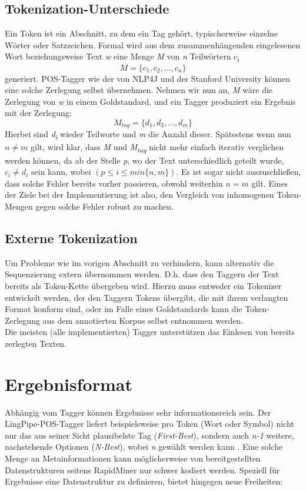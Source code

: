 \subsection{Tokenization-Unterschiede}
\label{sec:concept:sequence:tok}

Ein Token ist ein Abschnitt, zu dem ein Tag gehört, typischerweise einzelne Wörter oder Satzzeichen. Formal wird aus dem zusammenhängenden eingelesenen Wort beziehungsweise Text \textit{w} eine Menge \textit{M} von \textit{n} Teilwörtern c\textsubscript{i} 
 \[  M = \{ c_1 , c_2 , ... , c_n \} \] 
 generiert. POS-Tagger wie der von NLP4J \cite{choi} und der Stanford University \cite{Paper:StanfordTagger} können eine solche Zerlegung selbst übernehmen. Nehmen wir nun an, \textit{M} wäre die Zerlegung von \textit{w} in einem Goldstandard, und ein Tagger produziert ein Ergebnis mit der Zerlegung:
 \[  M_{tag} = \{ d_1 , d_2 , ... , d_m \} \]
Hierbei sind \textit{d\textsubscript{i}} wieder Teilworte und \textit{m} die Anzahl dieser. Spätestens wenn nun $n \neq m$ gilt, wird klar, dass \textit{M} und \textit{M\textsubscript{tag}} nicht mehr einfach iterativ verglichen werden können, da ab der Stelle \textit{p}, wo der Text unterschiedlich geteilt wurde, $ c_i \neq d_i $ sein kann, wobei $ (p \leq i \leq min\{ n, m \}) $. Es ist sogar nicht auszuschließen, dass solche Fehler bereits vorher passieren, obwohl weiterhin $n = m$ gilt.
\newline
Eines der Ziele bei der Implementierung ist also, den Vergleich von inhomogenen Token-Mengen gegen solche Fehler robust zu machen. 

\subsection{Externe Tokenization}
Um Probleme wie im vorigen Abschnitt zu verhindern, kann alternativ die Sequenzierung extern übernommen werden. D.h. dass den Taggern der Text bereits als Token-Kette übergeben wird. Hierzu muss entweder ein Tokenizer entwickelt werden, der den Taggern Tokens übergibt, die mit ihrem verlangten Format konform sind, oder im Falle eines Goldstandards kann die Token-Zerlegung aus dem annotierten Korpus selbst entnommen werden.
\\ Die meisten (alle implementierten) Tagger unterstützen das Einlesen von bereits zerlegten Texten.



\section{Ergebnisformat}
\label{sec:concept:format}
Abhängig vom Tagger können Ergebnisse sehr informationsreich sein. Der LingPipe-POS-Tagger liefert beispielsweise pro Token (Wort oder Symbol) nicht nur das aus seiner Sicht plausibelste Tag (\textit{First-Best}), sondern auch \textit{n-1} weitere, nachstehende Optionen (\textit{N-Best}), wobei \textit{n} gewählt werden kann \cite{Lingpipedoc}. Eine solche Menge an Metainformationen kann möglicherweise von bereitgestellten Datenstrukturen seitens RapidMiner nur schwer kodiert werden. Speziell für Ergebnisse eine Datenstruktur zu definieren, bietet hingegen neue Freiheiten:

